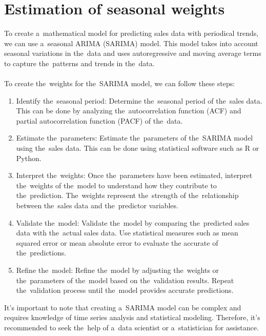     \section{Estimation of seasonal weights}\label{sec:weights}
    To create a~mathematical model for predicting sales data with periodical trends, we can use a~seasonal
    ARIMA (SARIMA) model. This model takes into account seasonal variations in the~data and uses autoregressive and
    moving average terms to capture the~patterns and trends in the~data.\\
    \\
    To create the~weights for the~SARIMA model, we can follow these steps:
    \begin{enumerate}
        \item Identify the~seasonal period: Determine the~seasonal period of the~sales data. This can be done by
        analyzing the~autocorrelation function (ACF) and partial autocorrelation function (PACF) of the~data.
        \item Estimate the~parameters: Estimate the~parameters of the~SARIMA model using the~sales data.
        This can be done using statistical software such as R or Python.
        \item Interpret the~weights: Once the~parameters have been estimated, interpret the~weights of the~model
        to understand how they contribute to the~prediction. The~weights represent the~strength of the~relationship
        between the~sales data and the~predictor variables.
        \item Validate the~model: Validate the~model by comparing the~predicted sales data with the~actual sales data.
        Use statistical measures such as mean squared error or mean absolute error to evaluate the
        accurate of the~predictions.
        \item Refine the~model: Refine the~model by adjusting the~weights or the~parameters of the~model based on
        the~validation results. Repeat the~validation process until the~model provides accurate predictions.
    \end{enumerate}
    It's important to note that creating a~SARIMA model can be complex and requires knowledge of time series
    analysis and statistical modeling. Therefore, it's recommended to seek the~help of a~data scientist
    or a~statistician for assistance.

